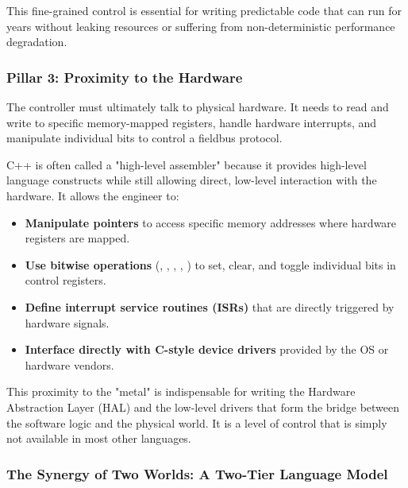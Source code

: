 This fine-grained control is essential for writing predictable code that can run for years without leaking resources or suffering from non-deterministic performance degradation.

\subsubsection{Pillar 3: Proximity to the Hardware}
\label{subsubsec:gpl_hardware}

The controller must ultimately talk to physical hardware. It needs to read and write to specific memory-mapped registers, handle hardware interrupts, and manipulate individual bits to control a fieldbus protocol.

C++ is often called a "high-level assembler" because it provides high-level language constructs while still allowing direct, low-level interaction with the hardware. It allows the engineer to:
\begin{itemize}
    \item \textbf{Manipulate pointers} to access specific memory addresses where hardware registers are mapped.
    \item \textbf{Use bitwise operations} (\hcode{&}, \hcode{|}, \hcode{^}, \hcode{<<}, \hcode{>>}) to set, clear, and toggle individual bits in control registers.
    \item \textbf{Define interrupt service routines (ISRs)} that are directly triggered by hardware signals.
    \item \textbf{Interface directly with C-style device drivers} provided by the OS or hardware vendors.
\end{itemize}

This proximity to the "metal" is indispensable for writing the Hardware Abstraction Layer (HAL) and the low-level drivers that form the bridge between the software logic and the physical world. It is a level of control that is simply not available in most other languages.



\subsubsection{The Synergy of Two Worlds: A Two-Tier Language Model}
\label{subsubsec:gpl_synergy}

